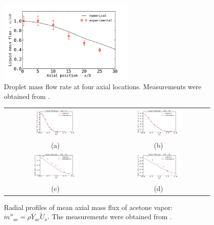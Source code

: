 \begin{figure}[!htb]
\centering
  \includegraphics[width=0.6\textwidth]{./figuras/chap5/massflow/drop_mflux.png}
\caption{Droplet mass flow rate at four axial locations. Measurements were obtained from \cite{chen}.}
\label{fig: droplet_flux}
\end{figure} 


\begin{figure}[!htb]
 \centering
\begin{tabular}{cc}
 \includegraphics[width=0.45\textwidth]{./figuras/chap5/massflow/mvapor5.png} & \includegraphics[width=0.45\textwidth]{./figuras/chap5/massflow/mvapor10.png} \\
(a) & (b) \\
\includegraphics[width=0.45\textwidth]{./figuras/chap5/massflow/mvapor15.png} & \includegraphics[width=0.45\textwidth]{./figuras/chap5/massflow/mvapor20.png} \\
(c) & (d)
\end{tabular}
 \caption{Radial profiles of mean axial mass flux of acetone vapor: $\dot{m}''_{ac}=\rho \bar{Y}_{ac} \tilde{U}_x$. The measurements were obtained from \cite{chen}.}
 \label{fig: vapor_flux}
\end{figure}

